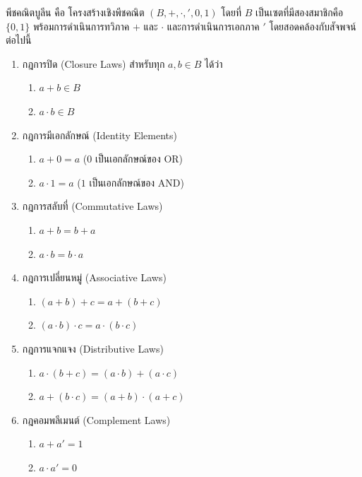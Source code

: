 \begin{definition}[พีชคณิตบูลีน]
พีชคณิตบูลีน คือ โครงสร้างเชิงพีชคณิต $(B, +, \cdot, ', 0, 1)$ โดยที่ $B$ เป็นเซตที่มีสองสมาชิกคือ $\{0, 1\}$ พร้อมการดำเนินการทวิภาค $+$ และ $\cdot$ และการดำเนินการเอกภาค $'$ โดยสอดคล้องกับสัจพจน์ต่อไปนี้

\begin{enumerate}
    \item กฎการปิด (Closure Laws) สำหรับทุก $a, b \in B$ ได้ว่า
    \begin{enumerate}
        \item $a + b \in B$
        \item $a \cdot b \in B$
    \end{enumerate}
    \item กฎการมีเอกลักษณ์ (Identity Elements)
    \begin{enumerate}
        \item $a + 0 = a$ ($0$ เป็นเอกลักษณ์ของ OR)
        \item $a \cdot 1 = a$ ($1$ เป็นเอกลักษณ์ของ AND)
    \end{enumerate}
    \item กฎการสลับที่ (Commutative Laws)
    \begin{enumerate}
        \item $a + b = b + a$
        \item $a \cdot b = b \cdot a$
    \end{enumerate}
    \item กฎการเปลี่ยนหมู่ (Associative Laws)
    \begin{enumerate}
        \item $(a + b) + c = a + (b + c)$
        \item $(a \cdot b) \cdot c = a \cdot (b \cdot c)$
    \end{enumerate}
    \item กฎการแจกแจง (Distributive Laws)
    \begin{enumerate}
        \item $a \cdot (b + c) = (a \cdot b) + (a \cdot c)$
        \item $a + (b \cdot c) = (a + b) \cdot (a + c)$
    \end{enumerate}
    \item กฎคอมพลีเมนต์ (Complement Laws)
    \begin{enumerate}
        \item $a + a' = 1$
        \item $a \cdot a' = 0$
    \end{enumerate}
\end{enumerate}
\end{definition}

